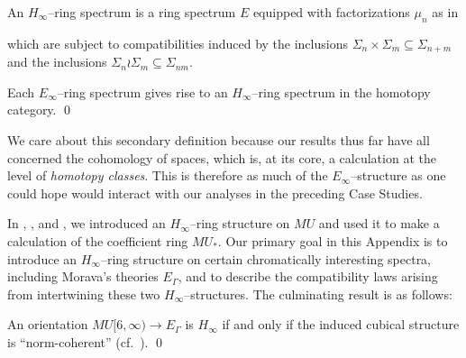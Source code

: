 \begin{definition}
An \(H_\infty\)--ring spectrum is a ring spectrum \(E\) equipped with factorizations \(\mu_n\) as in
\begin{center}
\end{center}
which are subject to compatibilities induced by the inclusions \(\Sigma_n \times \Sigma_m \subseteq \Sigma_{n+m}\) and the inclusions \(\Sigma_n \wr \Sigma_m \subseteq \Sigma_{nm}\).
\end{definition}

\begin{lemma}
Each \(E_\infty\)--ring spectrum gives rise to an \(H_\infty\)--ring spectrum in the homotopy category. \qed
\end{lemma}

\noindent We care about this secondary definition because our results thus far have all concerned the cohomology of spaces, which is, at its core, a calculation at the level of \emph{homotopy classes}.  This is therefore as much of the \(E_\infty\)--structure as one could hope would interact with our analyses in the preceding Case Studies.

In , , and , we introduced an \(H_\infty\)--ring structure on \(MU\) and used it to make a calculation of the coefficient ring \(MU_*\).  Our primary goal in this Appendix is to introduce an \(H_\infty\)--ring structure on certain chromatically interesting spectra, including Morava's theories \(E_\Gamma\), and to describe the compatibility laws arising from intertwining these two \(H_\infty\)--structures.  The culminating result is as follows:

\begin{theorem}
An orientation \(MU[6, \infty) \to E_\Gamma\) is \(H_\infty\) if and only if the induced cubical structure is ``norm-coherent'' (cf.\ ). \qed
\end{theorem}

